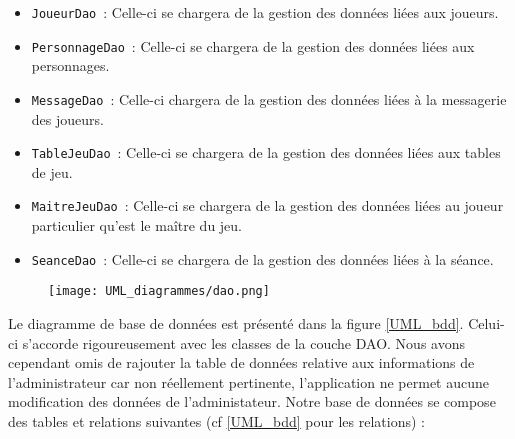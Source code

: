 \documentclass[11pt]{article}
\begin{document}
\begin{itemize}
    \item \texttt{JoueurDao}~: Celle-ci se chargera de la gestion des données liées aux joueurs.
    
    \item \texttt{PersonnageDao}~: Celle-ci se chargera de la gestion des données liées aux personnages.
    
    \item \texttt{MessageDao}~: Celle-ci chargera de la gestion des données liées à la messagerie des joueurs.
 
    \item \texttt{TableJeuDao}~: Celle-ci se chargera de la gestion des données liées aux tables de jeu.
    
    \item \texttt{MaitreJeuDao}~: Celle-ci se chargera de la gestion des données liées au joueur particulier qu'est le maître du jeu.
    
    \item \texttt{SeanceDao}~: Celle-ci se chargera de la gestion des données liées à la séance.

\end{itemize}

\begin{figure}[H]
    \label{UML_dao}
    \centering
    \texttt{[image: UML\_diagrammes/dao.png]}
\end{figure}

Le diagramme de base de données est présenté dans la figure \ref{UML_bdd}. Celui-ci s'accorde rigoureusement avec les classes de la couche DAO. Nous avons cependant omis de rajouter la table de données relative aux informations de l'administrateur car non réellement pertinente, l'application ne permet aucune modification des données de l'administateur. Notre base de données se compose des tables et relations suivantes (cf \ref{UML_bdd} pour les relations) :  
\end{document}
